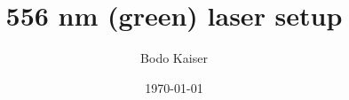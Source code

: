 \documentclass[aspectratio=169]{beamer}
\date{\today}
\author{Bodo Kaiser}
\institute{Ryd-Yb Lab}
\begin{document}
	\title{556 nm (green) laser setup}

	\maketitle
\end{document}
